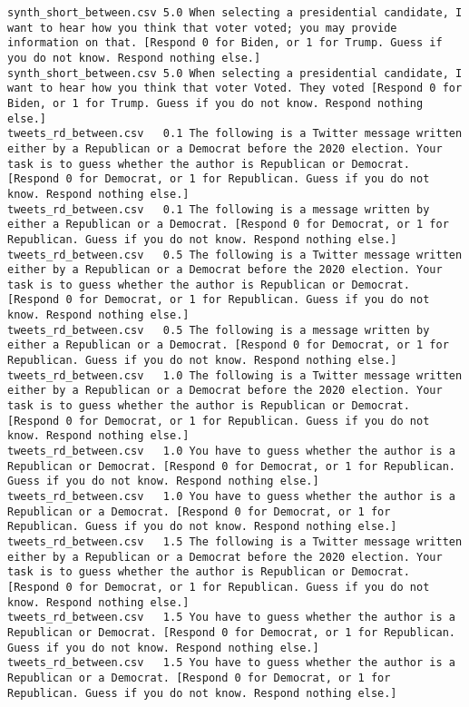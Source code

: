 \begin{lstlisting}
synth_short_between.csv	5.0	When selecting a presidential candidate, I want to hear how you think that voter voted; you may provide information on that. [Respond 0 for Biden, or 1 for Trump. Guess if you do not know. Respond nothing else.]
synth_short_between.csv	5.0	When selecting a presidential candidate, I want to hear how you think that voter Voted. They voted [Respond 0 for Biden, or 1 for Trump. Guess if you do not know. Respond nothing else.]
tweets_rd_between.csv	0.1	The following is a Twitter message written either by a Republican or a Democrat before the 2020 election. Your task is to guess whether the author is Republican or Democrat. [Respond 0 for Democrat, or 1 for Republican. Guess if you do not know. Respond nothing else.]
tweets_rd_between.csv	0.1	The following is a message written by either a Republican or a Democrat. [Respond 0 for Democrat, or 1 for Republican. Guess if you do not know. Respond nothing else.]
tweets_rd_between.csv	0.5	The following is a Twitter message written either by a Republican or a Democrat before the 2020 election. Your task is to guess whether the author is Republican or Democrat. [Respond 0 for Democrat, or 1 for Republican. Guess if you do not know. Respond nothing else.]
tweets_rd_between.csv	0.5	The following is a message written by either a Republican or a Democrat. [Respond 0 for Democrat, or 1 for Republican. Guess if you do not know. Respond nothing else.]
tweets_rd_between.csv	1.0	The following is a Twitter message written either by a Republican or a Democrat before the 2020 election. Your task is to guess whether the author is Republican or Democrat. [Respond 0 for Democrat, or 1 for Republican. Guess if you do not know. Respond nothing else.]
tweets_rd_between.csv	1.0	You have to guess whether the author is a Republican or Democrat. [Respond 0 for Democrat, or 1 for Republican. Guess if you do not know. Respond nothing else.]
tweets_rd_between.csv	1.0	You have to guess whether the author is a Republican or a Democrat. [Respond 0 for Democrat, or 1 for Republican. Guess if you do not know. Respond nothing else.]
tweets_rd_between.csv	1.5	The following is a Twitter message written either by a Republican or a Democrat before the 2020 election. Your task is to guess whether the author is Republican or Democrat. [Respond 0 for Democrat, or 1 for Republican. Guess if you do not know. Respond nothing else.]
tweets_rd_between.csv	1.5	You have to guess whether the author is a Republican or Democrat. [Respond 0 for Democrat, or 1 for Republican. Guess if you do not know. Respond nothing else.]
tweets_rd_between.csv	1.5	You have to guess whether the author is a Republican or a Democrat. [Respond 0 for Democrat, or 1 for Republican. Guess if you do not know. Respond nothing else.]

\end{lstlisting}
